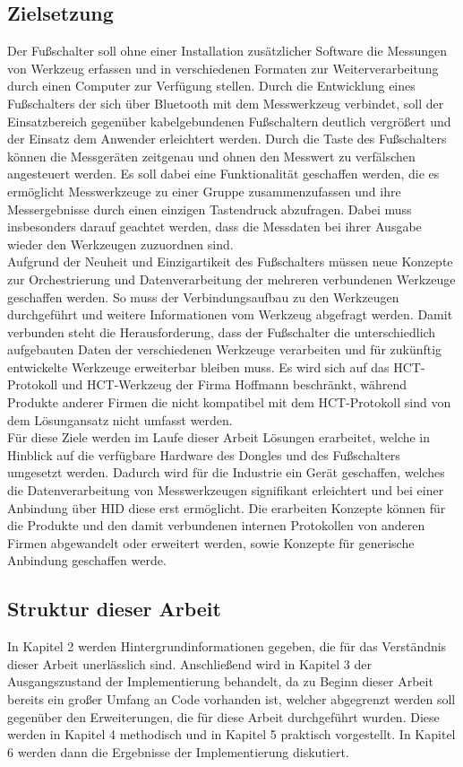 \subsection{Zielsetzung}
Der Fußschalter soll ohne einer Installation zusätzlicher Software die Messungen von Werkzeug erfassen und in verschiedenen Formaten zur Weiterverarbeitung durch einen Computer zur Verfügung stellen. Durch die Entwicklung eines Fußschalters der sich über Bluetooth mit dem Messwerkzeug verbindet, soll der Einsatzbereich gegenüber kabelgebundenen Fußschaltern deutlich vergrößert und der Einsatz dem Anwender erleichtert werden. Durch die Taste des Fußschalters können die Messgeräten zeitgenau und ohnen den Messwert zu verfälschen angesteuert werden. Es soll dabei eine Funktionalität geschaffen werden, die es ermöglicht Messwerkzeuge zu einer Gruppe zusammenzufassen und ihre Messergebnisse durch einen einzigen Tastendruck abzufragen. Dabei muss insbesonders darauf geachtet werden, dass die Messdaten bei ihrer Ausgabe wieder den Werkzeugen zuzuordnen sind.\\
Aufgrund der Neuheit und Einzigartikeit des Fußschalters müssen neue Konzepte zur Orchestrierung und Datenverarbeitung der mehreren verbundenen Werkzeuge geschaffen werden. So muss der Verbindungsaufbau zu den Werkzeugen durchgeführt und weitere Informationen vom Werkzeug abgefragt werden. Damit verbunden steht die Herausforderung, dass der Fußschalter die unterschiedlich aufgebauten Daten der verschiedenen Werkzeuge verarbeiten und für zukünftig entwickelte Werkzeuge erweiterbar bleiben muss. Es wird sich auf das \ac{HCT}-Protokoll und \ac{HCT}-Werkzeug der Firma Hoffmann beschränkt, während Produkte anderer Firmen die nicht kompatibel mit dem \ac{HCT}-Protokoll sind von dem Lösungansatz nicht umfasst werden.\\
Für diese Ziele werden im Laufe dieser Arbeit Lösungen erarbeitet, welche in Hinblick auf die verfügbare Hardware des Dongles und des Fußschalters umgesetzt werden. Dadurch wird für die Industrie ein Gerät geschaffen, welches die Datenverarbeitung von Messwerkzeugen signifikant erleichtert und bei einer Anbindung über \ac{HID} diese erst ermöglicht. Die erarbeiten Konzepte können für die Produkte und den damit verbundenen internen Protokollen von anderen Firmen abgewandelt oder erweitert werden, sowie Konzepte für generische Anbindung geschaffen werde.

\subsection{Struktur dieser Arbeit}
In Kapitel 2 werden Hintergrundinformationen gegeben, die für das Verständnis dieser Arbeit unerlässlich sind. Anschließend wird in Kapitel 3 der Ausgangszustand der Implementierung behandelt, da zu Beginn dieser Arbeit bereits ein großer Umfang an Code vorhanden ist, welcher abgegrenzt werden soll gegenüber den Erweiterungen, die für diese Arbeit durchgeführt wurden. Diese werden in Kapitel 4 methodisch und in Kapitel 5 praktisch vorgestellt. In Kapitel 6 werden dann die Ergebnisse der Implementierung diskutiert.